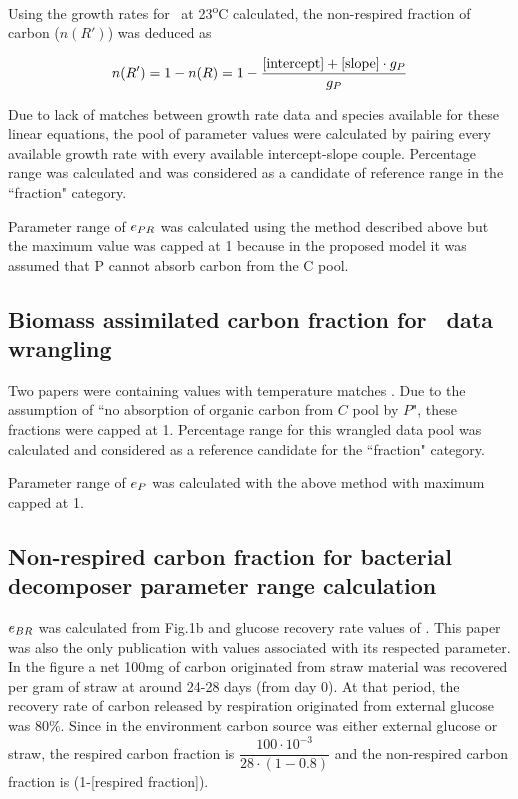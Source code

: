 \documentclass[../thesis.tex]{subfiles} %
\begin{document}
Using the growth rates for \phy\ at 23\textsuperscript{o}C calculated, the non-respired fraction of carbon ($n(R')$) was deduced as

\begin{equation}
    n(R') = 1-n(R) = 1-\dfrac{[\text{intercept}]+[\text{slope}]\cdot g_P}{g_P}
    \label{ePReqn}
\end{equation}

Due to lack of matches between growth rate data and species available for these linear equations, the pool of parameter values were calculated by pairing every available growth rate with every available intercept-slope couple.  Percentage range was calculated and was considered as a candidate of reference range in the ``fraction" category.

Parameter range of $e_{PR}$ was calculated using the method described above but the maximum value was capped at 1 because in the proposed model it was assumed that P cannot absorb carbon from the C pool.

\subsection{Biomass assimilated carbon fraction for \phy\ data wrangling}
Two papers were containing values with temperature matches \autocite{j1989respiration,samejima1958heterotrophic}.  Due to the assumption of ``no absorption of organic carbon from $C$ pool by $P$", these fractions were capped at 1.  Percentage range for this wrangled data pool was calculated and considered as a reference candidate for the ``fraction" category.

Parameter range of $e_P$ was calculated with the above method with maximum capped at 1.

\subsection{Non-respired carbon fraction for bacterial decomposer parameter range calculation}
$e_{BR}$ was calculated from Fig.1b and glucose recovery rate values of \autocite{cochran1988estimation}.  This paper was also the only publication with values associated with its respected parameter.  In the figure a net 100mg of carbon originated from straw material was recovered per gram of straw at around 24-28 days (from day 0).  At that period, the recovery rate of carbon released by respiration originated from external glucose was 80\%.  Since in the environment carbon source was either external glucose or straw, the respired carbon fraction is $\dfrac{100\cdot10^{-3}}{28\cdot(1-0.8)}$ and the non-respired carbon fraction is (1-[respired fraction]).
\end{document}
